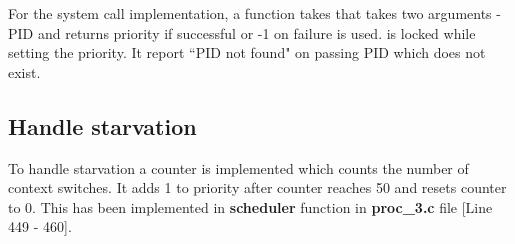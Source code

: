 \documentclass[12pt]{article}
\begin{document}
\vspace{5mm}
\begin{addmargin}[0.3in]{0in}
For the {} system call implementation, a function takes that takes two arguments - PID and returns priority if successful or -1 on failure is used. {} is locked while setting the priority. It report ``PID not found" on passing PID which does not exist.
\end{addmargin}
\subsection*{Handle starvation}
\begin{addmargin}[0.3in]{0in}
To handle starvation a counter is implemented which counts the number of context switches. It adds 1 to priority after counter reaches 50 and resets counter to 0. This has been implemented in \textbf{scheduler} function in \textbf{proc\_3.c} file [Line 449 - 460].
\end{addmargin}
\end{document}
